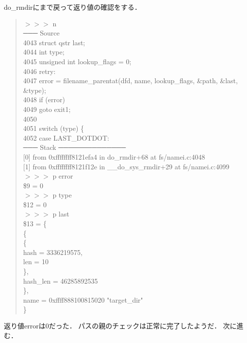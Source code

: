 do\_rmdirにまで戻って返り値の確認をする．
\begin{quote}
$>>>$ n \\
─── Source 
\\
 4043      struct qstr last; \\
 4044      int type; \\
 4045      unsigned int lookup\_flags = 0; \\
 4046  retry: \\
 4047      error = filename\_parentat(dfd, name, lookup\_flags, \&path, \&last, \&type); \\
 4048      if (error) \\
 4049          goto exit1; \\
 4050 \\
 4051      switch (type) \{ \\
 4052      case LAST\_DOTDOT: \\
─── Stack ──────────────
\\
{[0]} from 0xffffffff8121efa4 in do\_rmdir+68 at fs/namei.c:4048 \\
{[1]} from 0xffffffff8121f12e in \_\_do\_sys\_rmdir+29 at fs/namei.c:4099 \\
$>>>$ p error \\
\$9 = 0 \\
$>>>$ p type \\
\$12 = 0 \\
$>>>$ p last \\
\$13 = \{ \\
  \{ \\
    \{ \\
      hash = 3336219575, \\
      len = 10 \\
    \}, \\
    hash\_len = 46285892535 \\
  \}, \\
  name = 0xffff888100815020 "target\_dir" \\
\}
\end{quote}

返り値errorは0だった．
パスの親のチェックは正常に完了したようだ．
次に進む．

